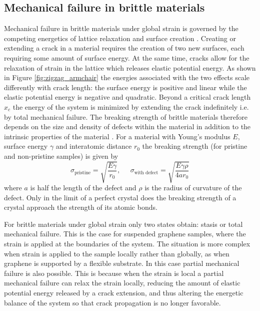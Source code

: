 \documentclass[edeposit,fullpage,draftthesis]{uiucthesis2009}
\begin{document}
        
        \subsection{Mechanical failure in brittle materials}
        \label{sec:bg:tearing}
  
        Mechanical failure in brittle materials under global strain is
        governed by the competing energetics of lattice relaxation
        and surface creation \cite{griffith1921phenomena}. Creating or extending a crack in a material 
        requires the creation of two new surfaces, each requiring some amount of surface energy. 
        At the same time, cracks allow for the relaxation of strain in the lattice which releases elastic potential energy. 
        As shown in Figure \ref{fig:zigzag_armchair} the energies associated with the two effects 
        scale differently with crack length:
        the surface energy is positive and linear while the elastic potential energy is negative and quadratic.
        Beyond a critical crack length $x_c$ the energy of the system is minimized by extending the crack indefinitely
        i.e. by total mechanical failure. 
        The breaking strength of brittle
        materials therefore depends on the size and density of defects within the material 
        in addition to the intrinsic properties of the material \cite{griffith1921phenomena}.
        For a material with Young's modulus $E$, surface energy $\gamma$ and interatomic distance $r_0$
        the breaking strength (for pristine and non-pristine samples) is given by
        \begin{equation}
            \sigma_\text{pristine} = \sqrt{\frac{E \gamma}{r_0}}, \;\;\;\;\;
            \sigma_\text{with defect} = \sqrt{\frac{E \gamma \rho}{4 a r_0}}
        \end{equation}
        where $a$ is half the length of the defect and $\rho$ is the radius of curvature of the defect.
        Only in the limit of a perfect crystal does the breaking strength of a crystal approach the strength
        of its atomic bonds. 
        
        For brittle materials under global strain only two states obtain: stasis or total mechanical failure.
        This is the case for suspended graphene samples, where the strain is applied at the boundaries of the system.
        The situation is more complex when strain is applied to the sample locally rather than globally, 
        as when graphene is supported by a flexible substrate. 
        In this case partial mechanical failure is also possible.
        This is because when the strain is local a partial mechanical failure can relax the strain locally, 
        reducing the amount of elastic potential energy released by a crack extension, and thus altering
        the energetic balance of the system so that crack propagation is no longer favorable.
        
\end{document}
